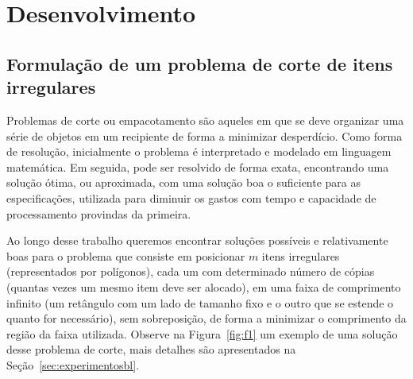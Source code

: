 

\chapter{Desenvolvimento}\label{cap_exemplos}


\section{Formulação de um problema de corte de itens irregulares} \label{sec:irregular}

Problemas de corte ou empacotamento são aqueles em que se deve organizar uma série de objetos em um recipiente de forma a minimizar desperdício. 
Como forma de resolução, inicialmente o problema é interpretado e modelado em linguagem matemática. 
Em seguida, pode ser resolvido de forma exata, encontrando uma solução ótima, ou aproximada, com uma solução boa o suficiente para as especificações, utilizada para diminuir os gastos com tempo e capacidade de processamento provindas da primeira.

Ao longo desse trabalho queremos encontrar soluções possíveis e relativamente boas para o problema que consiste em posicionar $m$ itens irregulares (representados por polígonos), cada um com determinado número de cópias (quantas vezes um mesmo item deve ser alocado), em uma faixa de comprimento infinito (um retângulo com um lado de tamanho fixo e o outro que se estende o quanto for necessário), sem sobreposição, de forma a minimizar o comprimento da região da faixa utilizada. 
Observe na Figura~\ref{fig:f1} um exemplo de uma solução desse problema de corte, mais detalhes são apresentados na Seção~\ref{sec:experimentosbl}.

